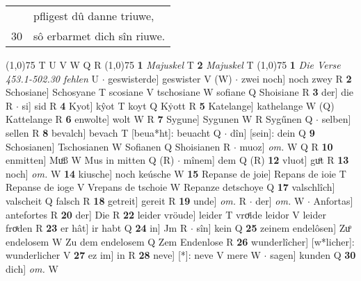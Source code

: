 \documentclass[8pt,a4paper,notitlepage]{article}
\begin{document}
\begin{table}[ht]
\begin{minipage}[t]{0.5\linewidth}
\begin{tabular}{rl}
 & pfligest dû danne triuwe,\\ 
30 & sô erbarmet dich sîn riuwe.\\ 
\end{tabular}
\scriptsize
\line(1,0){75} \newline
T U V W Q R \newline
\line(1,0){75} \newline
\textbf{1} \textit{Majuskel} T  \textbf{2} \textit{Majuskel} T  \newline
\line(1,0){75} \newline
\textbf{1} \textit{Die Verse 453.1-502.30 fehlen} U   $\cdot$ geswisterde] geswister V (W)  $\cdot$ zwei noch] noch zwey R \textbf{2} Schosiane] Schosyane T scosiane V tschosiane W sofiane Q Shoisiane R \textbf{3} der] die R  $\cdot$ si] sid R \textbf{4} Kyot] kŷot T koyt Q Kẏott R \textbf{5} Katelange] kathelange W (Q) Kattelange R \textbf{6} enwolte] wolt W R \textbf{7} Sygune] Sygunen W R Sygűnen Q  $\cdot$ selben] sellen R \textbf{8} bevalch] bevach T [beua*ht]: beuacht Q  $\cdot$ dîn] [sein]: dein Q \textbf{9} Schosianen] Tschosianen W Sofianen Q Shoisianen R  $\cdot$ muoz] \textit{om.} W Q R \textbf{10} enmitten] Muͦß W Mus in mitten Q (R)  $\cdot$ mînem] dem Q (R) \textbf{12} vluot] guͦt R \textbf{13} noch] \textit{om.} W \textbf{14} kiusche] noch keúsche W \textbf{15} Repanse de joie] Repans de ioie T Repanse de ioge V Vrepans de tschoie W Repanze detschoye Q \textbf{17} valschlîch] valscheit Q falsch R \textbf{18} getreit] gereit R \textbf{19} unde] \textit{om.} R  $\cdot$ der] \textit{om.} W  $\cdot$ Anfortas] antefortes R \textbf{20} der] Die R \textbf{22} leider vröude] leider T vroͤide leidor V leider froͯden R \textbf{23} er hât] ir habt Q \textbf{24} in] Jm R  $\cdot$ sîn] kein Q \textbf{25} zeinem endelôsen] Zuͦ endelosem W Zu dem endelosem Q Zem Endenlose R \textbf{26} wunderlîcher] [w*licher]: wunderlicher V \textbf{27} ez im] in R \textbf{28} neve] [*]: neve V mere W  $\cdot$ sagen] kunden Q \textbf{30} dich] \textit{om.} W \newline
\end{minipage}
\end{table}
\end{document}
